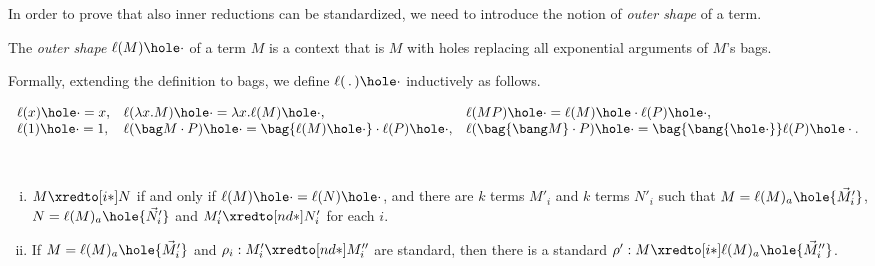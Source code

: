 In order to prove that also inner reductions can be standardized, we need to introduce the notion of 
{\em outer shape} of a term.
\begin{definition}
  The \emph{outer shape} $\ell(M)\hole\cdot$ of a term $M$ is a context that
  is $M$ with holes replacing all exponential arguments of $M$'s
  bags.

  Formally, extending the definition to bags, we define
  $\ell(\,.\,)\hole\cdot$ inductively as follows.
  
  $\begin{array}{lll}
    \ell(x)\hole\cdot = x, &
    \ell(\lambda x.M) \hole\cdot= \lambda x.\ell(M)\hole\cdot,&
    \ell(MP)\hole\cdot = \ell(M)\hole\cdot\ell(P)\hole\cdot,\\
    \ell(1)\hole\cdot  = 1,&
    \ell(\bag M\cdot P)\hole\cdot = \bag{\ell(M)\hole\cdot}\cdot\ell(P)\hole\cdot,&
    \ell(\bag{\bang M}\cdot P)\hole\cdot= \bag{\bang{\hole\cdot }}\ell(P)\hole\cdot.
  \end{array}$
\end{definition}
\begin{property}\label{lem:inner_outer}\
\begin{enumerate}[(i)]
\item \label{lem:inner_shape} $M\xredto[i*]N$ if and only if $\ell(M)\hole\cdot=\ell(N)\hole\cdot$, and there are $k$
  terms $M'_i$ and $k$ terms $N'_i$ such that
  $M=\ell(M)_a\hole{\vec M'_i}$, $N=\ell(M)_a\hole{\vec N'_i}$ and
  $M'_i\xredto[nd*]N'_i$ for each $i$.
\item \label{lem:outer_shape_std}
  If $M=\ell(M)_{a}\hole{\vec M'_i}$ and
  $\rho_i:M'_i\xredto[nd*]M''_i$
  are standard, then there is a standard 
  $\rho':M\xredto[i*]\ell(M)_{a}\hole{\vec M''_i}$.
\end{enumerate}
\end{property}
